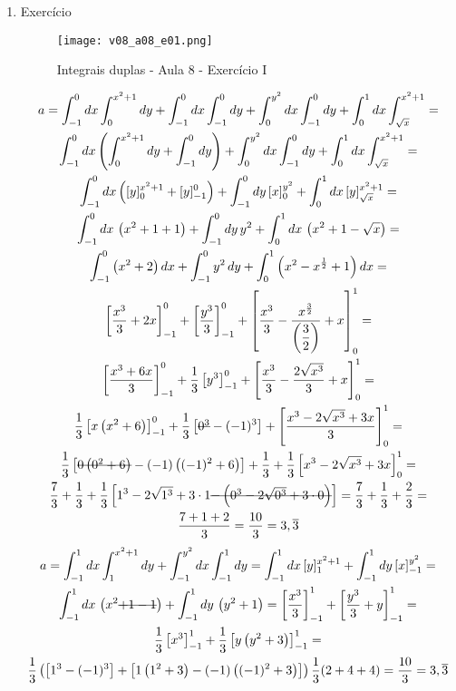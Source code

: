 \begin{enumerate}
	\item Exercício
	
	\begin{figure}[htb]
		\caption{Integrais duplas - Aula 8 - Exercício I}
		\label{v08_a08_e01}
		\centering
		\texttt{[image: v08\_a08\_e01.png]}		
	\end{figure}
	
	\begin{gather*}
		a = \int_{-1}^0 dx \int_0^{x^2 + 1} dy + \int_{-1}^0 dx \int_{-1}^0 dy + \int_0^{y^2} dx \int_{-1}^0 dy + \int_0^1 dx \int_{\sqrt{x}}^{x^2 + 1} =\\ \int_{-1}^0 dx\left(\int_0^{x^2 + 1} dy + \int_{-1}^0 dy\right)  + \int_0^{y^2} dx \int_{-1}^0 dy + \int_0^1 dx \int_{\sqrt{x}}^{x^2 + 1} =\\ \int_{-1}^0 dx \left([y]_0^{x^2 + 1} + [y]_{-1}^0\right)  + \int_{-1}^0 dy\, [x]_0^{y^2} + \int_0^1 dx\, [y]_{\sqrt{x}}^{x^2 + 1} =\\ \int_{-1}^0 dx\, \left(x^2 + 1 + 1\right) + \int_{-1}^0 dy\, y^2 + \int_0^1 dx\, \left(x^2 + 1 - \sqrt{x}\right) =\\ \int_{-1}^0 \left(x^2 + 2\right) dx + \int_{-1}^0 y^2\, dy + \int_0^1 \left(x^2 - x^{\frac{1}{2}} + 1\right) dx =\\ \left[\dfrac{x^3}{3} + 2x\right]_{-1}^0 + \left[\dfrac{y^3}{3}\right]_{-1}^0 + \left[\dfrac{x^3}{3} - \dfrac{x^{\frac{3}{2}}}{\left(\dfrac{3}{2}\right)} + x\right]_0^1 =\\ \left[\dfrac{x^3 + 6x}{3}\right]_{-1}^0 + \dfrac{1}{3}\left[y^3\right]_{-1}^0 + \left[\dfrac{x^3}{3} - \dfrac{2\sqrt{x^3}}{3} + x\right]_0^1 =\\ \dfrac{1}{3}\left[x\left(x^2 + 6\right)\right]_{-1}^0 + \dfrac{1}{3}\left[\overstrike{0^3} - (-1)^3\right] + \left[\dfrac{x^3 - 2\sqrt{x^3} + 3x}{3}\right]_0^1 =\\ \dfrac{1}{3}\left[\overstrike{0\left(0^2 + 6\right)} - (-1)\left((-1)^2 + 6\right)\right] + \dfrac{1}{3} + \dfrac{1}{3}\left[x^3 - 2\sqrt{x^3} + 3x\right]_0^1 =\\ \dfrac{7}{3} + \dfrac{1}{3} + \dfrac{1}{3}\left[1^3 - 2\sqrt{1^3} + 3\cdot1 \overstrike{- \left(0^3 - 2\sqrt{0^3} + 3\cdot0\right)}\right] = \dfrac{7}{3} + \dfrac{1}{3} + \dfrac{2}{3} =\\ \dfrac{7 + 1 + 2}{3} = \dfrac{10}{3} = 3,\overline{3}	
	\end{gather*}	
	\begin{gather*}
		a = \int_{-1}^1 dx \int_1^{x^2 + 1} dy + \int_{-1}^{y^2} dx \int_{-1}^1 dy = \int_{-1}^1 dx\, [y]_1^{x^2 + 1} + \int_{-1}^1 dy\, [x]_{-1}^{y^2} =\\ \int_{-1}^1 dx\, \left(x^2 \overstrike{+ 1 - 1}\right) + \int_{-1}^1 dy\, \left(y^2 + 1\right) = \left[\dfrac{x^3}{3}\right]_{-1}^1 + \left[\dfrac{y^3}{3} + y\right]_{-1}^1 =\\ \dfrac{1}{3}\left[x^3\right]_{-1}^1 + \dfrac{1}{3}\left[y\left(y^2 + 3\right)\right]_{-1}^1 =\\ \dfrac{1}{3}\left(\left[1^3 - (-1)^3\right] + \left[1\left(1^2 + 3\right) - (-1)\left((-1)^2 + 3\right)\right]\right)\dfrac{1}{3}(2 + 4 + 4) = \frac{10}{3} = 3,\overline{3}
	\end{gather*}
\end{enumerate}